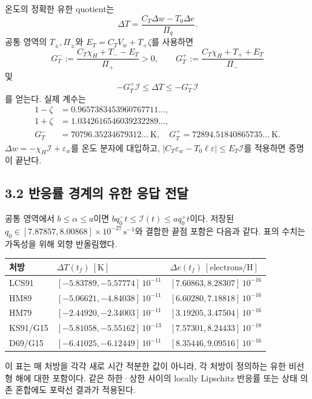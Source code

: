 \documentclass[11pt,a4paper]{article}
\newcommand{\Ical}{\mathcal I}\newcommand{\titleblock}[2]{\vspace*{2mm}{\large\sffamily\color{ink}#1}\par\vspace{2mm}{\LARGE\bfseries #2}\par\vspace{3mm}}
\begin{document}
온도의 정확한 유한 quotient는
\begin{equation}
 \Delta T=\frac{C_T\Delta w-T_0\Delta e}{\Pi_q}.
\end{equation}
공통 영역의 $T_\pm,\Pi_\pm$와
$E_T=C_TV_w+T_+\zeta$를 사용하면
\begin{equation}
 G_T^-:=\frac{C_T\chi_H+T_--E_T}{\Pi_+}>0,
 \qquad
 G_T^+:=\frac{C_T\chi_H+T_++E_T}{\Pi_-}
\end{equation}
및
\begin{equation}\boxed{-G_T^+\Ical\le\Delta T\le-G_T^-\Ical}\end{equation}
를 얻는다. 실제 계수는
\begin{align}
 1-\zeta&=0.9657383453960767711\ldots,\\
 1+\zeta&=1.0342616546039232289\ldots,\\
 G_T^-&=70796.35234679312\ldots\ \mathrm K,\quad
 G_T^+=72894.51840865735\ldots\ \mathrm K.
\end{align}
$\Delta w=-\chi_H\Ical+\varepsilon_w$를 온도 분자에 대입하고,
$|C_T\varepsilon_w-T_0\ell\varepsilon|\le E_T\Ical$를 적용하면 증명이 끝난다.

\subsection*{3.2 반응률 경계의 유한 응답 전달}
공통 영역에서 $b\le\alpha\le a$이면
$bq_0^-t\le\Ical(t)\le aq_0^+t$이다. 저장된
$q_0\in[7.87857,8.00868]\times10^{-27}\,\mathrm s^{-1}$와 결합한 끝점 포함은 다음과 같다. 표의 수치는 가독성을 위해 외향 반올림했다.
\begin{center}\begin{tabular}{@{}lll@{}}\toprule
처방 & $\Delta T(t_f)\ [\mathrm K]$ & $\Delta e(t_f)\ [\mathrm{electrons/H}]$\\\midrule
LCS91 & $[-5.83789,-5.57774]\,10^{-11}$ & $[7.60863,8.28307]\,10^{-16}$\\
HM89 & $[-5.06621,-4.84038]\,10^{-11}$ & $[6.60280,7.18818]\,10^{-16}$\\
HM79 & $[-2.44920,-2.34003]\,10^{-11}$ & $[3.19205,3.47504]\,10^{-16}$\\
KS91/G15 & $[-5.81058,-5.55162]\,10^{-13}$ & $[7.57301,8.24433]\,10^{-18}$\\
D69/G15 & $[-6.41025,-6.12449]\,10^{-11}$ & $[8.35446,9.09516]\,10^{-16}$\\\bottomrule
\end{tabular}\end{center}
이 표는 매 처방을 각각 새로 시간 적분한 값이 아니라, 각 처방이 정의하는 유한 비선형 해에 대한 포함이다. 같은 하한·상한 사이의 locally Lipschitz 반응률 또는 상태 의존 혼합에도 포락선 결과가 적용된다.
\end{document}
